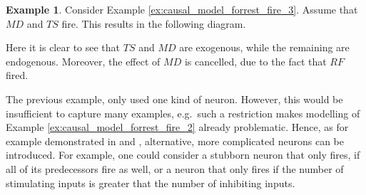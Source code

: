 \documentclass[11pt,a4paper]{book}
\theoremstyle{definition}
\theoremstyle{definition}
\newtheorem{example}{Example}[section]
\theoremstyle{definition}
\theoremstyle{remark}
\begin{document}
\begin{example}
Consider Example \ref{ex:causal_model_forrest_fire_3}. Assume that $\mathit{MD}$ and $\mathit{TS}$ fire. This results in the following diagram.
\begin{center}
\end{center}
Here it is clear to see that $\mathit{TS}$ and $\mathit{MD}$ are exogenous, while the remaining are endogenous. Moreover, the effect of $\mathit{MD}$ is cancelled, due to the fact that $\mathit{RF}$ fired.
\end{example}


The previous example, only used one kind of neuron. However, this would be insufficient to capture many examples, e.g.\ such a restriction makes modelling of Example \ref{ex:causal_model_forrest_fire_2} already problematic.
Hence, as for example demonstrated in \cite{hitchcock2009structural} and \cite{baumgartner2013regularity}, alternative, more complicated neurons can be introduced. For example, one could consider a stubborn neuron that only fires, if all of its predecessors fire as well, or a neuron that only fires if the number of stimulating inputs is greater that the number of inhibiting inputs.
\end{document}
